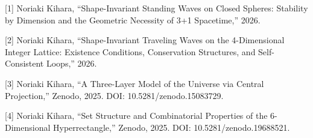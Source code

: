 \documentclass[
  a4paper,11pt]{article}
\theoremstyle{definition}
\theoremstyle{remark}
\begin{document}
{[}1{]} Noriaki Kihara, ``Shape-Invariant Standing Waves on Closed
Spheres: Stability by Dimension and the Geometric Necessity of 3+1
Spacetime,'' 2026.

{[}2{]} Noriaki Kihara, ``Shape-Invariant Traveling Waves on the
4-Dimensional Integer Lattice: Existence Conditions, Conservation
Structures, and Self-Consistent Loops,'' 2026.

{[}3{]} Noriaki Kihara, ``A Three-Layer Model of the Universe via
Central Projection,'' Zenodo, 2025. DOI: 10.5281/zenodo.15083729.

{[}4{]} Noriaki Kihara, ``Set Structure and Combinatorial Properties of
the 6-Dimensional Hyperrectangle,'' Zenodo, 2025. DOI:
10.5281/zenodo.19688521.
\end{document}
